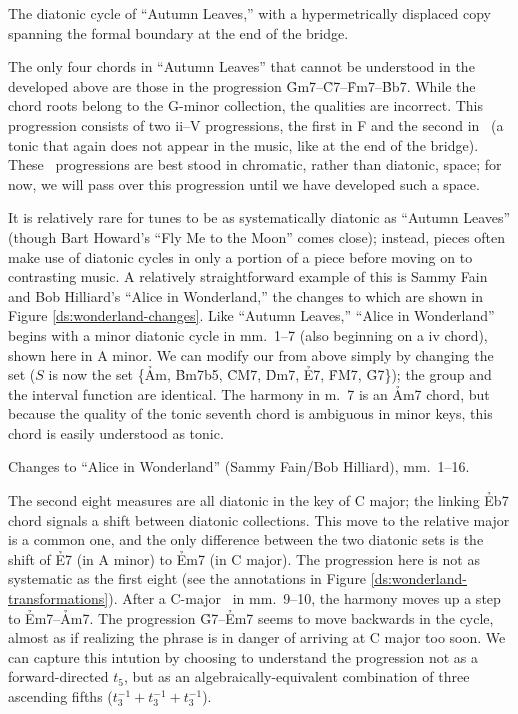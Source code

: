 \documentclass[diss]{subfiles}
\begin{document}
\figBeg[htbp]
  \caption{The diatonic cycle of “Autumn Leaves,” with a hypermetrically
    displaced copy spanning the formal boundary at the end of the bridge.}
  \label{ds:displaced-cycle}
\figEnd

The only four chords in “Autumn Leaves” that cannot be understood in the \gis{}
developed above are those in the progression
\h{Gm7}--\h{C7}--\h{Fm7}--\h{Bb7}.  While the chord roots belong to the
G-minor collection, the qualities are incorrect. This progression consists of
two \mbox{ii--V} progressions, the first in F and the second
in \Eflat\ (a tonic that again does not appear in the music, like at the end
of the bridge). These \tf\ progressions are best stood in chromatic, rather
than diatonic, space; for now, we will pass over this progression until we
have developed such a space.

It is relatively rare for tunes to be as systematically diatonic as “Autumn
Leaves” (though Bart Howard’s “Fly Me to the Moon” comes close); instead,
pieces often make use of diatonic cycles in only a portion of a piece before
moving on to contrasting music. A relatively straightforward example of this
is Sammy Fain and Bob Hilliard’s “Alice in Wonderland,” the changes to which
are shown in Figure \ref{ds:wonderland-changes}. Like “Autumn
Leaves,” “Alice in Wonderland” begins with a minor diatonic cycle in mm.~1--7
(also beginning on a iv chord), shown here in A minor. We can modify our \gis{}
from above simply by changing the set ($S$ is now the set \{\h{Am}, \h{Bm7b5},
\h{CM7}, \h{Dm7}, \h{E7}, \h{FM7}, \h{G7}\}); the group \ivls{} and the
interval function are identical. The harmony in m.~7 is an \h{Am7} chord,
but because the quality of the tonic seventh chord is ambiguous in minor
keys, this chord is easily understood as tonic.

\figBeg[htbp]
  \caption{Changes to “Alice in Wonderland” (Sammy Fain/Bob Hilliard), mm.\
  1--16.}
  \label{ds:wonderland-changes}
\figEnd

The second eight measures are all diatonic in the key of C major; the linking
\h{Eb7} chord signals a shift between diatonic collections.\fn{ds-14} This
move to the relative major is a common one, and the only difference between
the two diatonic sets is the shift of \h{E7} (in A minor) to \h{Em7} (in C
major). The progression here is not as systematic as the first eight (see the
annotations in Figure \ref{ds:wonderland-transformations}). After a C-major
\tf\ in mm.~9--10, the harmony moves up a step to \h{Em7}--\h{Am7}.
The progression \h{G7}--\h{Em7} seems to move backwards in the cycle, almost
as if realizing the phrase is in danger of arriving at C major too soon. We
can capture this intution by choosing to understand the progression not as a
forward-directed $t_5$, but as an algebraically-equivalent combination of
three ascending fifths ($t_3^{-1} + t_3^{-1} + t_3^{-1}$).
\end{document}
